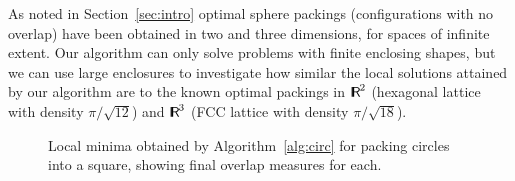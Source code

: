 \documentclass{siamltex}
\begin{document}
As noted in Section~\ref{sec:intro} optimal sphere packings
(configurations with no overlap) have been obtained in two and three
dimensions, for spaces of infinite extent.
Our algorithm can only solve problems with finite enclosing shapes,
but we can use large enclosures to investigate how similar the local
solutions attained by our algorithm are to the known optimal packings
in ${\makebox{\sf I \hspace{-8.5 pt} R \hspace{-4.0pt}}}^2$ (hexagonal lattice with density $\pi/\sqrt{12}$) and ${\makebox{\sf I \hspace{-8.5 pt} R \hspace{-4.0pt}}}^3$
(FCC lattice with density $\pi/\sqrt{18}$).

\begin{figure}[!b]
\centering
{} \;
 \;
 \;

\caption{Local minima obtained by Algorithm~\ref{alg:circ} for
    packing circles into a square, showing final overlap measures for each.\label{fig:sphere_packing_in_square}}
\end{figure}
\end{document}
